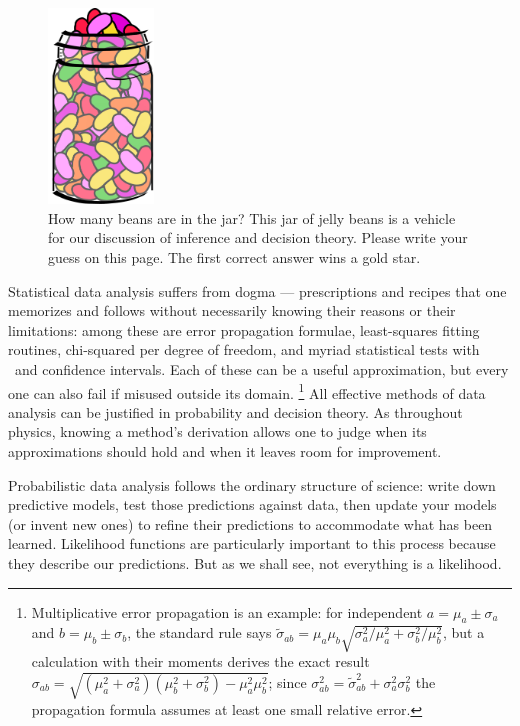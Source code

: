 \begin{figure}[tp]
\centering
\includegraphics[width=0.25\textwidth]{figures/searches_beans.pdf}
\caption[
How many beans are in the jar?
]{%
How many beans are in the jar? This jar of jelly beans is a vehicle for our
discussion of inference and decision theory.
Please write your guess on this page.
The first correct answer wins a gold star.
}
\label{fig:searches_beans}
\end{figure}

Statistical data analysis suffers from dogma --- prescriptions and recipes that
one memorizes and follows without necessarily knowing their reasons or their
limitations:
among these are
error propagation formulae,
least-squares fitting routines,
chi-squared per degree of freedom,
and myriad statistical tests with \pvalues\ and confidence intervals.
Each of these can be a useful approximation, but every one can also fail if
misused outside its domain.%
\footnote{%
Multiplicative error propagation is an example:
for independent $a = \mu_a \pm \sigma_a$ and $b = \mu_b \pm \sigma_b$,
the standard rule says
\(
\widetilde{\sigma}_{ab}
= \mu_a \mu_b \sqrt{\sigma_a^2/\mu_a^2 + \sigma_b^2/\mu_b^2}
\),
but a calculation with their moments derives the exact result
\(
\sigma_{ab}
= \sqrt{(\mu_a^2 + \sigma_a^2)(\mu_b^2 + \sigma_b^2) - \mu_a^2\mu_b^2}
\);
since $\sigma_{ab}^2 = \widetilde{\sigma}_{ab}^2 + \sigma_a^2 \sigma_b^2$
the propagation formula assumes at least one small relative error.
}
All effective methods of data analysis can be justified in probability and
decision theory.
As throughout physics, knowing a method's derivation allows one to judge when
its approximations should hold and when it leaves room for improvement.

Probabilistic data analysis follows the ordinary structure of science:
write down predictive models, test those predictions against data,
then update your models (or invent new ones) to refine their predictions
to accommodate what has been learned.
Likelihood functions are particularly important to this process because they
describe our predictions.
But as we shall see, not everything is a likelihood.

